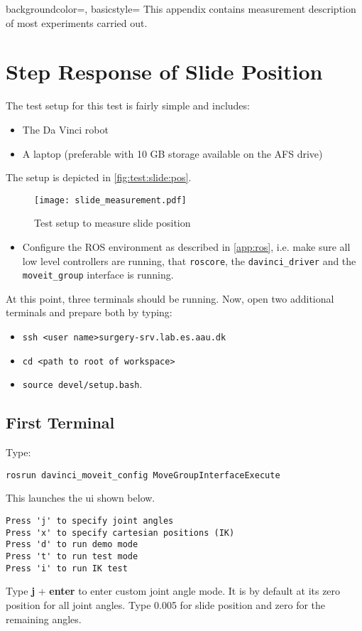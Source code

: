 {
    backgroundcolor=\color{black},
    basicstyle=\scriptsize\color{green}\ttfamily
}
This appendix contains measurement description of most experiments carried out.
\section{Step Response of Slide Position}
The test setup for this test is fairly simple and includes:
\begin{itemize}
\item The Da Vinci robot
\item A laptop (preferable with 10 GB storage available on the AFS drive)
\end{itemize}
The setup is depicted in \autoref{fig:test:slide:pos}.
\begin{figure}[H]\hspace{-1.4cm}
\texttt{[image: slide\_measurement.pdf]}
\caption{Test setup to measure slide position}
\label{fig:test:slide:pos}
\end{figure}
\begin{itemize}
\item Configure the ROS environment as described in \autoref{app:ros}, i.e. make sure all low level controllers are running, that \texttt{roscore}, the \texttt{davinci\_driver} and the \texttt{moveit\_group} interface is running.
\end{itemize}
At this point, three terminals should be running. Now, open two additional terminals and prepare both by typing:
\begin{itemize}
\item \texttt{ssh <user name>surgery-srv.lab.es.aau.dk} 
\item \texttt{cd <path to root of workspace>}
\item \texttt{source devel/setup.bash}.
\end{itemize}
\subsection*{First Terminal}
Type:

\hspace{1cm} \texttt{rosrun davinci\_moveit\_config MoveGroupInterfaceExecute}

This launches the \gls{ui} shown below.
\begin{lstlisting}[style=DOS]
Press 'j' to specify joint angles
Press 'x' to specify cartesian positions (IK)
Press 'd' to run demo mode
Press 't' to run test mode
Press 'i' to run IK test 
\end{lstlisting}
Type \textbf{j} + \textbf{enter} to enter custom joint angle mode. It is by default at its zero position for all joint angles. Type 0.005 for slide position and zero for the remaining angles.
